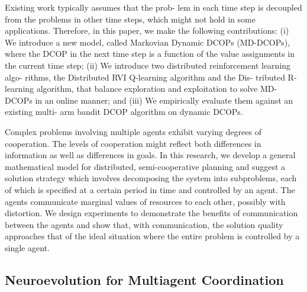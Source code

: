 \documentclass[conference]{IEEEtran}
\begin{document}
\cite{nguyen2014decentralized} Existing work typically assumes that the prob-
lem in each time step is decoupled from the problems in other time steps,
which might not hold in some applications. Therefore, in this paper, we make
the following contributions: (i) We introduce a new model, called Markovian
Dynamic DCOPs (MD-DCOPs), where the DCOP in the next time step is a function
of the value assignments in the current time step; (ii) We introduce two
distributed reinforcement learning algo- rithms, the Distributed RVI
Q-learning algorithm and the Dis- tributed R-learning algorithm, that balance
exploration and exploitation to solve MD-DCOPs in an online manner; and (iii)
We empirically evaluate them against an existing multi- arm bandit DCOP
algorithm on dynamic DCOPs.


\cite{zhang2013coordinating}

\cite{banerjee2012sample}

\cite{kraemer2012informed}

\cite{boukhtouta2011adaptive}
Complex problems involving multiple agents exhibit varying degrees of
cooperation. The levels of cooperation might reflect both differences in
information as well as differences in goals. In this research, we develop a
general mathematical model for distributed, semi-cooperative planning and
suggest a solution strategy which involves decomposing the system into
subproblems, each of which is specified at a certain period in time and
controlled by an agent. The agents communicate marginal values of resources to
each other, possibly with distortion. We design experiments to demonstrate the
benefits of communication between the agents and show that, with
communication, the solution quality approaches that of the ideal situation
where the entire problem is controlled by a single agent.

\cite{sen1994learning}

\subsection{Neuroevolution for Multiagent Coordination}




\end{document}
